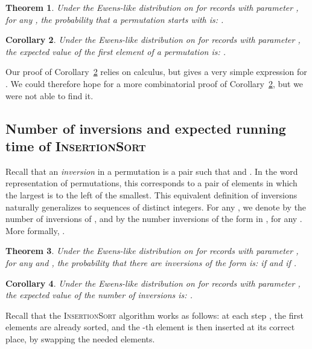 \documentclass[proceedings]{aofa}
\newcommand{\InsertSort}{\textsc{InsertionSort}\xspace}
\newtheorem{theorem}{Theorem}
\newtheorem{corollary}[theorem]{Corollary}
\newenvironment{remark}{\noindent{\bf Remark:} }{\hfill}
\begin{document}
\begin{theorem}\label{cor:first_value=k}
Under the Ewens-like distribution on  for records with parameter , 
for any , 
the probability that a permutation starts with  is: 
.
\end{theorem}

\begin{corollary}\label{thm:first_value}
Under the Ewens-like distribution on  for records with parameter , the expected value of the first element of a permutation is: 
.
\end{corollary}

\begin{remark}
Our proof of Corollary~\ref{thm:first_value} relies on calculus, but gives a very simple expression for . 
We could therefore hope for a more combinatorial proof of Corollary~\ref{thm:first_value}, but we were not able to find it.
\end{remark}

\subsection{Number of inversions and expected running time of \InsertSort}\label{sec:insertion}

Recall that an \emph{inversion} in a permutation  is a pair  such that  and . 
In the word representation of permutations, this corresponds to a pair of elements in which the largest is to the left of the smallest. 
This equivalent definition of inversions naturally generalizes to sequences of distinct integers. 
For any , we denote by  the number of inversions of , 
and by  the number inversions of the form  in , for any . 
More formally, .


\begin{theorem}\label{lem:inversion_at_j}
Under the Ewens-like distribution on  for records with parameter , 
for any  and , 
the probability that there are  inversions of the form  is: 
 if  
and  if . 
\end{theorem}

\begin{corollary}\label{thm:nb_of_inversions}
Under the Ewens-like distribution on  for records with parameter , the expected value of the number of inversions is: 
.
\end{corollary}

Recall that the \InsertSort algorithm works as follows: at each step
, the first  elements are already sorted, and the
-th element is then inserted at its correct place, by swapping the needed elements. 
\end{document}

